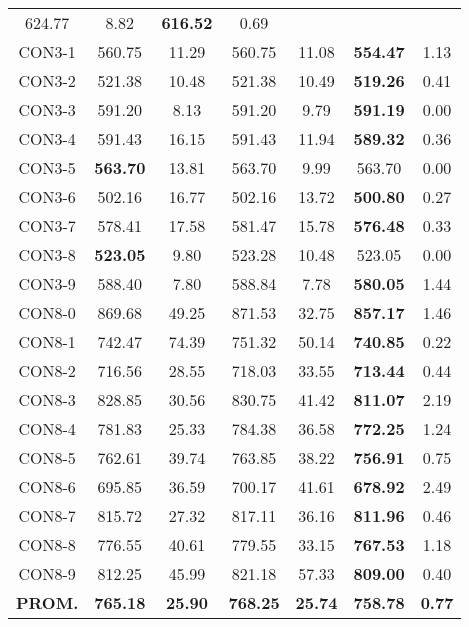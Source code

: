\begin{table}[ht]
\begin{tabular}{c c c c c c c}
624.77 & 8.82 & \bf{616.52} & 
0.69\\CON3-1 & 560.75 & 11.29 & 
560.75 & 11.08 & \bf{554.47} & 
1.13\\CON3-2 & 521.38 & 10.48 & 
521.38 & 10.49 & \bf{519.26} & 
0.41\\CON3-3 & 591.20 & 8.13 & 
591.20 & 9.79 & \bf{591.19} & 
0.00\\CON3-4 & 591.43 & 16.15 & 
591.43 & 11.94 & \bf{589.32} & 
0.36\\CON3-5 & \bf{563.70} & 13.81 & 
563.70 & 9.99 & 563.70 & 0.00\\
CON3-6 & 502.16 & 16.77 & 
502.16 & 13.72 & \bf{500.80} & 
0.27\\CON3-7 & 578.41 & 17.58 & 
581.47 & 15.78 & \bf{576.48} & 
0.33\\CON3-8 & \bf{523.05} & 9.80 & 
523.28 & 10.48 & 523.05 & 0.00\\
CON3-9 & 588.40 & 7.80 & 
588.84 & 7.78 & \bf{580.05} & 
1.44\\CON8-0 & 869.68 & 49.25 & 
871.53 & 32.75 & \bf{857.17} & 
1.46\\CON8-1 & 742.47 & 74.39 & 
751.32 & 50.14 & \bf{740.85} & 
0.22\\CON8-2 & 716.56 & 28.55 & 
718.03 & 33.55 & \bf{713.44} & 
0.44\\CON8-3 & 828.85 & 30.56 & 
830.75 & 41.42 & \bf{811.07} & 
2.19\\CON8-4 & 781.83 & 25.33 & 
784.38 & 36.58 & \bf{772.25} & 
1.24\\CON8-5 & 762.61 & 39.74 & 
763.85 & 38.22 & \bf{756.91} & 
0.75\\CON8-6 & 695.85 & 36.59 & 
700.17 & 41.61 & \bf{678.92} & 
2.49\\CON8-7 & 815.72 & 27.32 & 
817.11 & 36.16 & \bf{811.96} & 
0.46\\CON8-8 & 776.55 & 40.61 & 
779.55 & 33.15 & \bf{767.53} & 
1.18\\CON8-9 & 812.25 & 45.99 & 
821.18 & 57.33 & \bf{809.00} & 
0.40\\\bf{PROM.} & 
\bf{765.18} & \bf{25.90} & \bf{768.25} & \bf{25.74} & \bf{758.78} & \bf{0.77}\\[1ex]\hline
\end{tabular}
\label{table:nonlin}
\end{table} \clearpage
